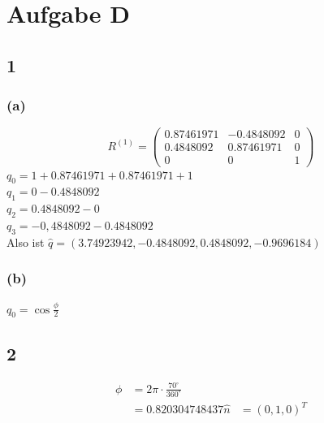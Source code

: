 \documentclass{../Vorlage/mat}
\begin{document}
\section*{Aufgabe D}
\subsection*{1}
\subsubsection*{(a)}
\begin{equation}
	R^{(1)} = \begin{pmatrix}
	0.87461971 & -0.4848092 & 0 \\
	0.4848092 & 0.87461971 & 0\\
	0&0&1
	\end{pmatrix}
\end{equation}
$q_0 = 1 + 0.87461971 + 0.87461971 + 1$\\
$q_1 = 0 - 0.4848092$\\
$q_2 = 0.4848092 - 0$\\
$q_3 = -0,4848092 - 0.4848092$\\
Also ist $\hat{q} = (3.74923942, -0.4848092, 0.4848092, -0.9696184)$
\subsubsection*{(b)}
$q_0 = \cos{\frac{\phi}{2}}$
\subsection*{2}
\begin{align*}
\phi & = 2 \pi \cdot \frac{70^{\circ}}{360^{\circ}}\\
& = 0.820304748437 
\hat{n} & = (0,1,0)^T
\end{align*}
\end{document}
